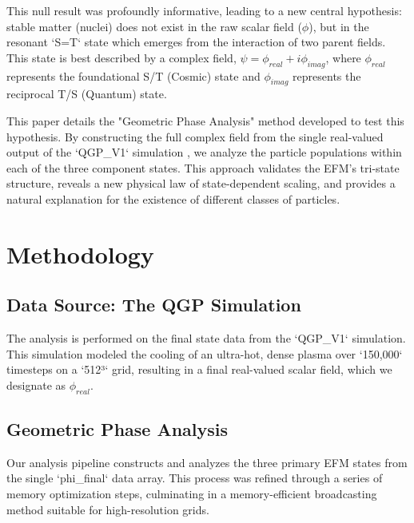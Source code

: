 \documentclass[11pt]{article}
\begin{document}
This null result was profoundly informative, leading to a new central hypothesis: stable matter (nuclei) does not exist in the raw scalar field (\(\phi\)), but in the resonant `S=T` state which emerges from the interaction of two parent fields. This state is best described by a complex field, \(\psi = \phi_{real} + i\phi_{imag}\), where \(\phi_{real}\) represents the foundational S/T (Cosmic) state and \(\phi_{imag}\) represents the reciprocal T/S (Quantum) state.

This paper details the "Geometric Phase Analysis" method developed to test this hypothesis. By constructing the full complex field from the single real-valued output of the `QGP_V1` simulation \citep{atomsform_notebook}, we analyze the particle populations within each of the three component states. This approach validates the EFM's tri-state structure, reveals a new physical law of state-dependent scaling, and provides a natural explanation for the existence of different classes of particles.

\section{Methodology}
\subsection{Data Source: The QGP Simulation}
The analysis is performed on the final state data from the `QGP_V1` simulation. This simulation modeled the cooling of an ultra-hot, dense plasma over `150,000` timesteps on a `512³` grid, resulting in a final real-valued scalar field, which we designate as \(\phi_{real}\).

\subsection{Geometric Phase Analysis}
Our analysis pipeline constructs and analyzes the three primary EFM states from the single `phi_final` data array. This process was refined through a series of memory optimization steps, culminating in a memory-efficient broadcasting method suitable for high-resolution grids.
\end{document}
